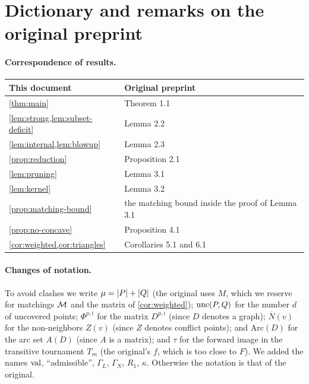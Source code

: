 \section{Dictionary and remarks on the original preprint}\label{app:dictionary}

\paragraph{Correspondence of results.}
\begin{center}\small
\begin{tabular}{@{}ll@{}}
\toprule
This document & Original preprint\\
\midrule
\cref{thm:main} & Theorem 1.1\\
\cref{lem:strong,lem:subset-deficit} & Lemma 2.2\\
\cref{lem:internal,lem:blowup} & Lemma 2.3\\
\cref{prop:reduction} & Proposition 2.1\\
\cref{lem:pruning} & Lemma 3.1\\
\cref{lem:kernel} & Lemma 3.2\\
\cref{prop:matching-bound} & the matching bound inside the proof of Lemma 3.1\\
\cref{prop:no-concave} & Proposition 4.1\\
\cref{cor:weighted,cor:triangles} & Corollaries 5.1 and 6.1\\
\bottomrule
\end{tabular}
\end{center}

\paragraph{Changes of notation.}
To avoid clashes we write $\mu=\lvert P\rvert+\lvert Q\rvert$ (the original uses $M$, which
we reserve for matchings $\mathcal M$ and the matrix of \cref{cor:weighted});
$\operatorname{unc}(P,Q)$ for the number $d$ of uncovered points; $\Phi^{p,i}$ for the
matrix $D^{p,i}$ (since $D$ denotes a graph); $\overline N(v)$ for the
non-neighbors $Z(v)$ (since $Z$ denotes conflict points); and
$\mathrm{Arc}(D)$ for the arc set $A(D)$ (since $A$ is a matrix); and $\tau$
for the forward image in the transitive tournament $T_m$ (the original's $f$,
which is too close to $F$). We added the
names $\operatorname{val}$, ``admissible'', $\Gamma_L$, $\Gamma_N$, $R_1$, $\kappa$.
Otherwise the notation is that of the original.

